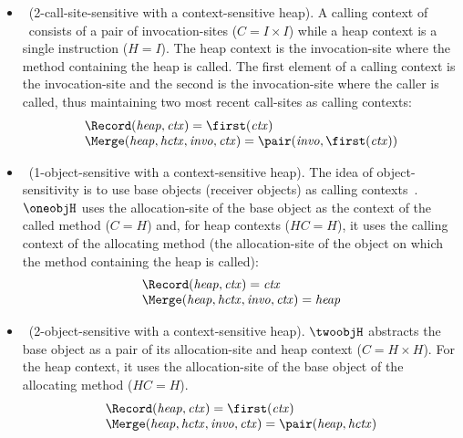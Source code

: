 {\begin{itemize}
\item {\twocallH~(2-call-site-sensitive with a context-sensitive
    heap)}. A calling context of \twocallH~consists of a pair of
  invocation-sites ($C = I\times I$) while a heap context is a single
  instruction ($H = I$).  The heap context is the invocation-site where
  the method containing the heap is called. The first element of a calling
  context is the invocation-site and the second is the invocation-site
  where the caller is called, thus maintaining two most recent
  call-sites as calling contexts: 
\[
\begin{array}{l}
 \Record ({\it heap}, {\it ctx}) = \first({\it ctx})\\
 \Merge ({\it heap, hctx, invo, ctx}) = \pair({\it invo}, \first({\it ctx})) \\
\end{array}
\]

\item {\oneobjH~(1-object-sensitive with a context-sensitive heap)}.
The idea of object-sensitivity is to use base objects (receiver
objects) as calling contexts~\cite{Milanova2005}. $\oneobjH$ uses the allocation-site of the
base object as the context of the called method  ($C = H$) and, for
heap contexts ($HC = H$), it uses
the calling context of the allocating method (the allocation-site of the object on which the method
containing the heap is called): 
\[
\begin{array}{l}
\Record ({\it heap}, {\it ctx}) = {\it ctx}\\
\Merge ({\it heap, hctx, invo, ctx}) = {\it heap} \\
\end{array}
\]

\item {\twoobjH~(2-object-sensitive with a context-sensitive
    heap)}. $\twoobjH$ abstracts the base object as a pair of its
  allocation-site and heap context ($C = H \times H$). For the heap
  context, it uses the allocation-site of the base object of the
  allocating method ($HC = H$).
\[
\begin{array}{l}
\Record ({\it heap}, {\it ctx}) = \first({\it ctx})\\
\Merge ({\it heap, hctx, invo, ctx}) = \pair({\it heap}, {\it hctx}) \\
\end{array}
\]


\end{itemize}}
